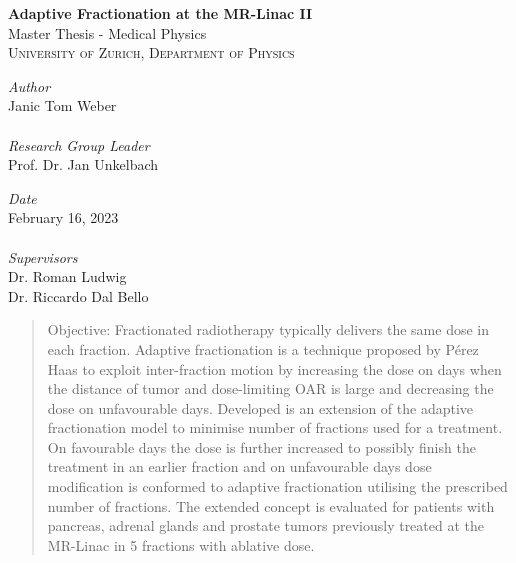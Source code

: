 \documentclass[\relativeRoot/ada.tex]{subfiles}
\begin{document}
\begin{titlepage}

\HRulebeta

\vspace{3cm}
  {\bfseries
	\Large\textbf{Adaptive Fractionation at the MR-Linac II}
	}\\[14pt]
	{Master Thesis - Medical Physics}\\[1pt]
	\textsc{University of Zurich, Department of Physics}
	\\[5pt]
	
\begin{addmargin}[1cm]{1cm}


\begin{minipage}[t]{0.6\textwidth}
\emph{Author}\\
Janic Tom Weber\\\\
\emph{Research Group Leader}\\
Prof. Dr. Jan Unkelbach \\
\end{minipage}
\begin{minipage}[t]{0.34\textwidth}
\emph{Date}\\
February 16, 2023\\\\
\emph{Supervisors}\\
Dr. Roman Ludwig \\
Dr. Riccardo Dal Bello\\[10pt]
\end{minipage}

\end{addmargin}

	

	
\begin{abstract}

    Objective: Fractionated radiotherapy typically delivers the same dose in each fraction. Adaptive fractionation is a technique proposed by Pérez Haas \cite{perezhaas_adaptive} to exploit inter-fraction motion by increasing the dose on days when the distance of tumor and dose-limiting OAR is large and decreasing the dose on unfavourable days. Developed is an extension of the adaptive fractionation model to minimise number of fractions used for a treatment. On favourable days the dose is further increased to possibly finish the treatment in an earlier fraction and on unfavourable days dose modification is conformed to adaptive fractionation utilising the prescribed number of fractions. The extended concept is evaluated for patients with pancreas, adrenal glands and prostate tumors previously treated at the MR-Linac in 5 fractions with ablative dose.


\end{abstract}
\end{titlepage}
\end{document}

